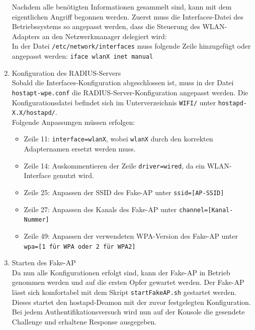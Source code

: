 \begin{enumerate}
	Nachdem alle benötigten Informationen gesammelt sind, kann mit dem eigentlichen Angriff begonnen werden. Zuerst muss die Interfaces-Datei des Betriebssystems so angepasst werden, dass die Steuerung des WLAN-Adapters an den Netzwerkmanager delegiert wird: \\
	In der Datei \colorbox{altgray}{\lstinline|/etc/network/interfaces|} muss folgende Zeile hinzugefügt oder angepasst werden: \colorbox{altgray}{\lstinline|iface wlanX inet manual|}
	\item {Konfiguration des RADIUS-Servers}\\
	Sobald die Interfaces-Konfiguration abgeschlossen ist, muss in der Datei \colorbox{altgray}{\lstinline|hostapt-wpe.conf|} die RADIUS-Server-Konfiguration angepasst werden. Die Konfigurationsdatei befindet sich im Unterverzeichnis \colorbox{altgray}{\lstinline|WIFI/|} unter \colorbox{altgray}{\lstinline|hostapd-X.X/hostapd/|}.\\
	Folgende Anpassungen müssen erfolgen: \\
	\begin{itemize}
		\item Zeile 11: \colorbox{altgray}{\lstinline|interface=wlanX|}, wobei \colorbox{altgray}{\lstinline|wlanX|} durch den korrekten Adapternamen ersetzt werden muss.
		\item Zeile 14: Auskommentieren der Zeile \colorbox{altgray}{\lstinline|driver=wired|}, da ein WLAN-Interface genutzt wird.
		\item Zeile 25: Anpassen der SSID des Fake-AP unter \colorbox{altgray}{\lstinline|ssid=[AP-SSID]|}
		\item Zeile 27: Anpassen des Kanals des Fake-AP unter \colorbox{altgray}{\lstinline|channel=[Kanal-Nummer]|}
		\item Zeile 49: Anpassen der verwendeten WPA-Version des Fake-AP unter \colorbox{altgray}{\lstinline|wpa=[1 für WPA oder 2 für WPA2]|}
	\end{itemize}
	\item {Starten des Fake-AP}\\
	Da nun alle Konfigurationen erfolgt sind, kann der Fake-AP in Betrieb genommen werden und auf die ersten Opfer gewartet werden. Der Fake-AP lässt sich komfortabel mit dem Skript \colorbox{altgray}{\lstinline|startFakeAP.sh|} gestartet werden. Dieses startet den hostapd-Deamon mit der zuvor festgelegten Konfiguration. Bei jedem Authentifikationsversuch wird nun auf der Konsole die gesendete Challenge und erhaltene Response ausgegeben.
	\begin{figure}[H]

\end{figure}
\end{enumerate}
